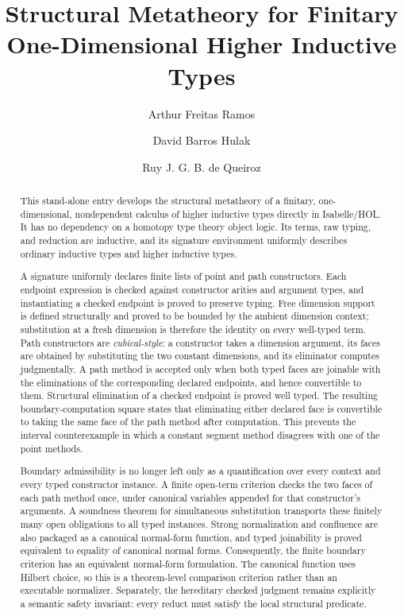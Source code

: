 \documentclass[11pt,a4paper]{article}
\begin{document}
\title{Structural Metatheory for Finitary One-Dimensional Higher Inductive Types}
\author{Arthur Freitas Ramos \and David Barros Hulak \and
  Ruy J. G. B. de Queiroz}
\maketitle

\begin{abstract}
This stand-alone entry develops the structural metatheory of a finitary,
one-dimensional, nondependent calculus of higher inductive types directly in
Isabelle/HOL. It has no dependency on a homotopy type theory object logic. Its
terms, raw typing, and reduction are inductive, and its signature environment
uniformly describes ordinary inductive types and higher inductive types.

A signature uniformly declares finite lists of point and path constructors.
Each endpoint expression is checked against constructor arities and argument
types, and instantiating a checked endpoint is proved to preserve typing.
Free dimension support is defined structurally and proved to be bounded by the
ambient dimension context; substitution at a fresh dimension is therefore the
identity on every well-typed term.
Path constructors are \emph{cubical-style}: a constructor takes a dimension
argument, its faces are obtained by substituting the two constant dimensions,
and its eliminator computes judgmentally. A path method is accepted only when
both typed faces are joinable with the eliminations of the corresponding
declared endpoints, and hence convertible to them. Structural elimination of 
a checked endpoint is proved
well typed. The resulting boundary-computation square states that eliminating
either declared face is convertible to taking the same face of the path method
after computation. This prevents the interval counterexample in which a
constant segment method disagrees with one of the point methods.

Boundary admissibility is no longer left only as a quantification over every
context and every typed constructor instance. A finite open-term criterion
checks the two faces of each path method once, under canonical variables
appended for that constructor's arguments. A soundness theorem for simultaneous
substitution transports these finitely many open obligations to all typed
instances. Strong normalization and confluence are also packaged as a canonical
normal-form function, and typed joinability is proved equivalent to equality of
canonical normal forms. Consequently, the finite boundary criterion has an
equivalent normal-form formulation. The canonical function uses Hilbert choice,
so this is a theorem-level comparison criterion rather than an executable
normalizer. Separately, the hereditary checked judgment remains explicitly a
semantic safety invariant: every reduct must satisfy the local structural
predicate.


\end{abstract}
\end{document}
